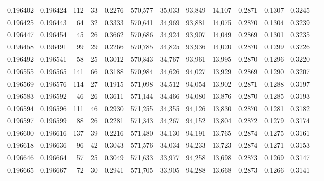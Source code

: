 \begin{tabular}{rrrrrrrrrrrrr}
0.196402 & 0.196424 &   112 &  33 &                                     0.2276 & 570,577 &  35,033 &  93,849 &  14,107 & 0.2871 & 0.1307 & 0.3245 \\
0.196425 & 0.196443 &    64 &  32 &                                     0.3333 & 570,641 &  34,969 &  93,881 &  14,075 & 0.2870 & 0.1304 & 0.3239 \\
0.196447 & 0.196454 &    45 &  26 &                                     0.3662 & 570,686 &  34,924 &  93,907 &  14,049 & 0.2869 & 0.1301 & 0.3235 \\
0.196458 & 0.196491 &    99 &  29 &                                     0.2266 & 570,785 &  34,825 &  93,936 &  14,020 & 0.2870 & 0.1299 & 0.3226 \\
0.196492 & 0.196541 &    58 &  25 &                                     0.3012 & 570,843 &  34,767 &  93,961 &  13,995 & 0.2870 & 0.1296 & 0.3220 \\
0.196555 & 0.196565 &   141 &  66 &                                     0.3188 & 570,984 &  34,626 &  94,027 &  13,929 & 0.2869 & 0.1290 & 0.3207 \\
0.196569 & 0.196576 &   114 &  27 &                                     0.1915 & 571,098 &  34,512 &  94,054 &  13,902 & 0.2871 & 0.1288 & 0.3197 \\
0.196583 & 0.196592 &    46 &  26 &                                     0.3611 & 571,144 &  34,466 &  94,080 &  13,876 & 0.2870 & 0.1285 & 0.3193 \\
0.196594 & 0.196596 &   111 &  46 &                                     0.2930 & 571,255 &  34,355 &  94,126 &  13,830 & 0.2870 & 0.1281 & 0.3182 \\
0.196597 & 0.196599 &    88 &  26 &                                     0.2281 & 571,343 &  34,267 &  94,152 &  13,804 & 0.2872 & 0.1279 & 0.3174 \\
0.196600 & 0.196616 &   137 &  39 &                                     0.2216 & 571,480 &  34,130 &  94,191 &  13,765 & 0.2874 & 0.1275 & 0.3161 \\
0.196618 & 0.196636 &    96 &  42 &                                     0.3043 & 571,576 &  34,034 &  94,233 &  13,723 & 0.2874 & 0.1271 & 0.3153 \\
0.196646 & 0.196664 &    57 &  25 &                                     0.3049 & 571,633 &  33,977 &  94,258 &  13,698 & 0.2873 & 0.1269 & 0.3147 \\
0.196665 & 0.196667 &    72 &  30 &                                     0.2941 & 571,705 &  33,905 &  94,288 &  13,668 & 0.2873 & 0.1266 & 0.3141 \\

\end{tabular}
